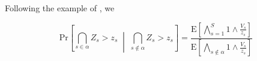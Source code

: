 \begin{comment}
                \item need to make a statement harkening back to the fact this is a simulation of
                    storm parameters sampled via latin hypercube, so the definition of 'return period'
                    in this context is suspect.
            \end{itemize}
            \item Given shaky conception of multivariate return period, we might consider alternative 
                definitions more relevant to an inundation field.
            \begin{itemize}
                \item Total Inundation field?  (some univariate transformation?)
                \item number of locales under significant flooding?
            \end{itemize}
        \end{itemize}
        \item Application results
    \end{itemize}
\end{comment}

Following the example of \cite{trubey:pg}, we 



\begin{equation}
    \text{Pr}\left[\bigcap_{s\in\alpha}Z_s > z_s\;\middle|\;\bigcap_{s\not\in\alpha}Z_s > z_s\right] =
    \frac{
        \text{E}\left[\bigwedge_{s=1}^S 1\wedge \frac{V_s}{z_s}\right]
    }{
        \text{E}\left[\bigwedge_{s\not\in\alpha} 1\wedge \frac{V_s}{z_s}\right]
    }    
\end{equation}






